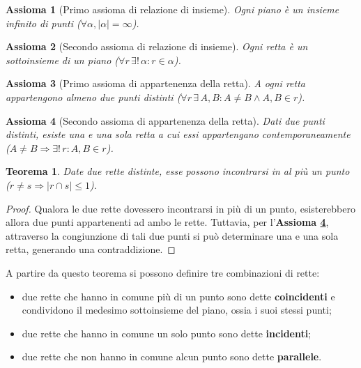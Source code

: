\documentclass{article}
\newtheorem{axiom}{Assioma}[section]
\newtheorem{theorem}{Teorema}[section]
\theoremstyle{definition}
\begin{document}
\begin{axiom}[Primo assioma di relazione di insieme]
    Ogni piano è un insieme infinito di punti
    ($\forall \alpha, |\alpha| = \infty$).
\end{axiom}

\begin{axiom}[Secondo assioma di relazione di insieme]
    Ogni retta è un sottoinsieme di un piano
    ($\forall r \, \exists! \, \alpha : r \in \alpha$).
\end{axiom}

\begin{axiom}[Primo assioma di appartenenza della retta]
    A ogni retta appartengono almeno due punti distinti
    ($\forall r \, \exists \, A, B : A \neq B \land A, B \in r$).
\end{axiom}

\begin{axiom}[Secondo assioma di appartenenza della retta]
    \label{retta:secondo_assioma_appartenenza}
    Dati due punti distinti, esiste una e una sola retta a cui
    essi appartengano contemporaneamente
    ($A \neq B \Rightarrow \exists! \, r : A, B \in r$).
\end{axiom}

\begin{theorem}
    Date due rette distinte, esse possono incontrarsi
    in al più un punto
    ($r \neq s \Rightarrow |r \cap s| \leq 1$).
\end{theorem}

\begin{proof}
    Qualora le due rette dovessero incontrarsi in più di un punto, esisterebbero
    allora due punti appartenenti ad
    ambo le rette. Tuttavia, per
    l'\textbf{Assioma \ref{retta:secondo_assioma_appartenenza}},
    attraverso la congiunzione di tali due punti
    si può determinare una e una sola retta,
    generando una contraddizione.
\end{proof}

A partire da questo teorema si possono definire tre combinazioni di rette:

\begin{itemize}[noitemsep]
    \item due rette che hanno in comune più di un
          punto sono dette \textbf{coincidenti} e condividono
          il medesimo sottoinsieme del piano, ossia i suoi
          stessi punti;
    \item due rette che hanno in comune un solo punto
          sono dette \textbf{incidenti};
    \item due rette che non hanno in comune alcun punto
          sono dette \textbf{parallele}.
\end{itemize}
\end{document}
